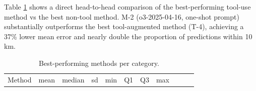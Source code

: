 \documentclass[
  10pt,
  twocolumn]{article}
\begin{document}
Table \ref{tbl:best_methods} shows a direct head-to-head comparison of
the best-performing tool-use method vs the best non-tool method. M-2
(o3-2025-04-16, one-shot prompt) substantially outperforms the best
tool-augmented method (T-4), achieving a 37\% lower mean error and
nearly double the proportion of predictions within 10 km.

\begin{longtable}[]{@{}
  >{\raggedright\arraybackslash}p{}
  >{\raggedright\arraybackslash}p{}
  >{\raggedright\arraybackslash}p{}
  >{\raggedright\arraybackslash}p{}
  >{\raggedright\arraybackslash}p{}
  >{\raggedright\arraybackslash}p{}
  >{\raggedright\arraybackslash}p{}
  >{\raggedright\arraybackslash}p{}
  >{\raggedright\arraybackslash}p{}
  >{\raggedright\arraybackslash}p{}
  >{\raggedright\arraybackslash}p{}@{}}
\caption{\label{tbl:best_methods}Best-performing methods per
category.}\tabularnewline
\toprule\noalign{}
\begin{minipage}[b]{\linewidth}\raggedright
Method
\end{minipage} & \begin{minipage}[b]{\linewidth}\raggedright
mean
\end{minipage} & \begin{minipage}[b]{\linewidth}\raggedright
median
\end{minipage} & \begin{minipage}[b]{\linewidth}\raggedright
sd
\end{minipage} & \begin{minipage}[b]{\linewidth}\raggedright
min
\end{minipage} & \begin{minipage}[b]{\linewidth}\raggedright
Q1
\end{minipage} & \begin{minipage}[b]{\linewidth}\raggedright
Q3
\end{minipage} & \begin{minipage}[b]{\linewidth}\raggedright
max
\end{minipage} & \begin{minipage}[b]{\linewidth}\raggedright

\end{minipage}
\end{longtable}
\end{document}
